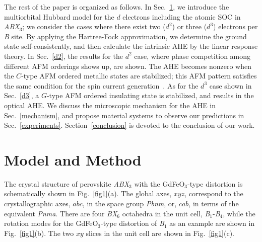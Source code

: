 \documentclass[aps,twocolumn,prb,preprintnumbers,amsmath,amssymb]{revtex4-2}
\begin{document}
The rest of the paper is organized as follows. 
In Sec.~\ref{ModelMethods}, we introduce the multiorbital Hubbard model for the $d$ electrons including the atomic SOC 
 in {\it ABX}$_3$; 
 we consider the cases where there exist two ($d^2$) or three ($d^3$)  electrons per {\it B} site.
By applying the Hartree-Fock approximation, we determine the ground state self-consistently, 
 and then calculate the intrinsic AHE by the linear response theory. 
In Sec.~\ref{d2}, the results for the $d^2$ case, where phase competition among different AFM orderings shows up, are shown. 
 The AHE becomes nonzero when the $C$-type AFM ordered metallic states are stabilized; 
 this AFM pattern satisfies the same condition for the spin current generation~\cite{naka3}. 
As for the $d^3$ case shown in Sec.~\ref{d3}, 
 a $G$-type AFM ordered insulating state is stabilized, and results in the optical AHE. 
We discuss the microscopic mechanism for the AHE in Sec.~\ref{mechanism}, 
 and propose material systems to observe our predictions in Sec.~\ref{experiments}. 
Section~\ref{conclusion} is devoted to the conclusion of our work. 

\section{Model and Method}\label{ModelMethods}

The crystal structure of perovskite {\it ABX}$_3$ with the GdFeO$_3$-type distortion 
 is schematically shown in Fig.~\ref{fig1}(a). 
The global axes, $xyz$, correspond to the crystallographic axes, $abc$, in the space group {\it Pbnm}, 
 or, $cab$, in terms of the equivalent {\it Pnma}. 
There are four {\it BX}$_6$ octahedra in the unit cell, {\it B}$_1$-{\it B}$_4$, 
 while the rotation modes for the GdFeO$_3$-type distortion of {\it B}$_1$ as an example are shown in Fig.~\ref{fig1}(b). 
The two $xy$ slices in the unit cell are shown in Fig.~\ref{fig1}(c). 
\end{document}
